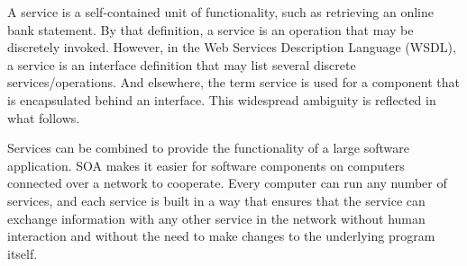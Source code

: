 \documentclass[a4paper]{article}
\begin{document}
	A service is a self-contained unit of functionality, such as retrieving an online bank statement. By that definition, a service is an operation
	that may be discretely invoked. However, in the Web Services Description Language (WSDL), a service is an interface definition that may list several
	discrete services/operations. And elsewhere, the term service is used for a component that is encapsulated behind an interface. This widespread
	ambiguity is reflected in what follows.
	
	Services can be combined to provide the functionality of a large software application. SOA makes it easier for software components on computers
	connected over a network to cooperate. Every computer can run any number of services, and each service is built in a way that ensures that the service
	can exchange information with any other service in the network without human interaction and without the need to make changes to the underlying program
	itself.
	
	
\end{document}
